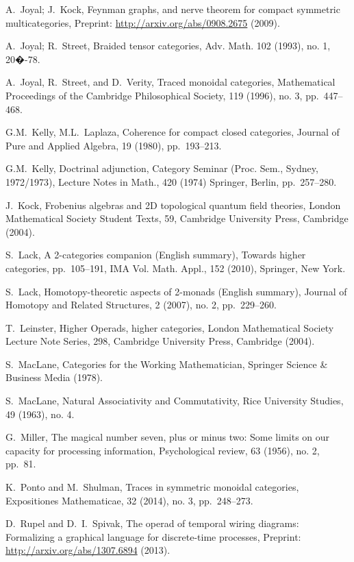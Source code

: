 \documentclass[11pt,oneside,article]{memoir}
\begin{document}
\begin{thebibliography}{XXX}
 A.~Joyal; J.~Kock, Feynman graphs, and nerve theorem for compact symmetric multicategories, Preprint: \url{http://arxiv.org/abs/0908.2675} (2009).
 
 A.~Joyal; R.~Street, Braided tensor categories, Adv. Math. 102 (1993), no. 1, 20�-78. 

 A.~Joyal, R.~Street, and D.~Verity, Traced monoidal categories, Mathematical Proceedings of the Cambridge Philosophical Society, 119 (1996), no. 3, pp.~447--468.

 G.M.~Kelly, M.L.~Laplaza, Coherence for compact closed categories, Journal of Pure and Applied Algebra, 19 (1980), pp.~193--213.

 G.M.~Kelly, Doctrinal adjunction, Category Seminar (Proc. Sem., Sydney, 1972/1973), Lecture Notes in Math., 420 (1974) Springer, Berlin, pp.~257--280.

 J.~Kock, Frobenius algebras and 2D topological quantum field theories, London Mathematical Society Student Texts, 59, Cambridge University Press, Cambridge (2004).

 S.~Lack, A 2-categories companion (English summary), Towards higher categories, pp.~105--191, IMA Vol. Math. Appl., 152  (2010), Springer, New York.

 S.~Lack, Homotopy-theoretic aspects of 2-monads (English summary), Journal of Homotopy and Related Structures, 2 (2007), no. 2, pp.~229--260.

 T.~Leinster, Higher Operads, higher categories, London Mathematical Society Lecture Note Series, 298, Cambridge University Press, Cambridge (2004).

 S.~MacLane, Categories for the Working Mathematician, Springer Science \& Business Media (1978).

S.~MacLane, Natural Associativity and Commutativity, Rice University Studies, 49 (1963), no. 4.

 G.~Miller, The magical number seven, plus or minus two: Some limits on our capacity for processing information, Psychological review, 63 (1956), no. 2, pp.~81.

 K.~Ponto and M.~Shulman, Traces in symmetric monoidal categories, Expositiones Mathematicae, 32 (2014), no. 3, pp.~248--273.

 D.~Rupel and D.~I.~Spivak, The operad of temporal wiring diagrams: Formalizing a graphical language for discrete-time processes, Preprint: \url{http://arxiv.org/abs/1307.6894} (2013).


\end{thebibliography}
\end{document}
